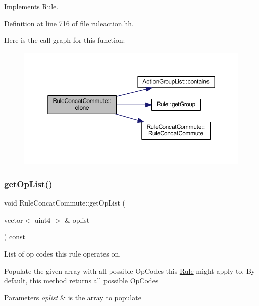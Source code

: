 Implements \mbox{\hyperlink{class_rule_a70de90a76461bfa7ea0b575ce3c11e4d}{Rule}}.



Definition at line 716 of file ruleaction.\+hh.

Here is the call graph for this function\+:
\nopagebreak
\begin{figure}[H]
\begin{center}
\leavevmode
\includegraphics[width=350pt]{class_rule_concat_commute_ac1f7bc3a2249397cd9a5d2a1cfb8b0db_cgraph}
\end{center}
\end{figure}
\mbox{\label{class_rule_concat_commute_a5c3b84b40f77aec4e51ee59b5911474f}} 
\subsubsection{\texorpdfstring{getOpList()}{getOpList()}}
{\footnotesize\ttfamily void Rule\+Concat\+Commute\+::get\+Op\+List (\begin{DoxyParamCaption}\item[{vector$<$ uint4 $>$ \&}]{oplist }\end{DoxyParamCaption}) const\hspace{0.3cm}{\ttfamily [virtual]}}



List of op codes this rule operates on. 

Populate the given array with all possible Op\+Codes this \mbox{\hyperlink{class_rule}{Rule}} might apply to. By default, this method returns all possible Op\+Codes 
\begin{DoxyParams}{Parameters}
{\em oplist} & is the array to populate \\
\hline
\end{DoxyParams}


